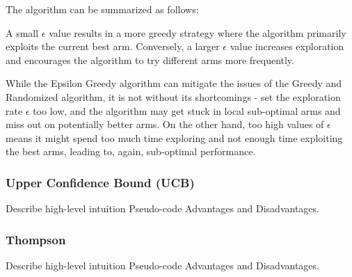 The algorithm can be summarized as follows:


A small $\epsilon$ value results in a more greedy strategy where the algorithm primarily exploits the current best arm. Conversely, a larger $\epsilon$ value increases exploration and encourages the algorithm to try different arms more frequently.

While the Epsilon Greedy algorithm can mitigate the issues of the Greedy and Randomized algorithm, it is not without its shortcomings - set the exploration rate $\epsilon$ too low, and the algorithm may get stuck in local sub-optimal arms and miss out on potentially better arms. On the other hand, too high values of $\epsilon$ means it might spend too much time exploring and not enough time exploiting the best arms, leading to, again, sub-optimal performance.


\subsubsection{Upper Confidence Bound (UCB)}
\label{sec:UCB}
Describe high-level intuition
Pseudo-code
Advantages and Disadvantages.

\subsubsection{Thompson}
\label{sec:Thompson}
Describe high-level intuition
Pseudo-code
Advantages and Disadvantages.